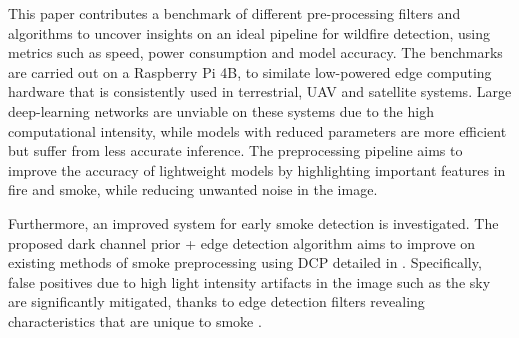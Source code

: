 \documentclass[lettersize,journal]{IEEEtran}
\begin{document}
This paper contributes a benchmark of different pre-processing filters
and algorithms to uncover insights on an ideal pipeline for wildfire
detection, using metrics such as speed, power consumption and model
accuracy. The benchmarks are carried out on a Raspberry Pi 4B, to
similate low-powered edge computing hardware that is consistently used
in terrestrial, UAV and satellite systems. Large deep-learning networks
are unviable on these systems due to the high computational intensity,
while models with reduced parameters are more efficient but suffer from
less accurate inference. The preprocessing pipeline aims to improve the
accuracy of lightweight models by highlighting important features in
fire and smoke, while reducing unwanted noise in the image.

Furthermore, an improved system for early smoke detection is
investigated. The proposed dark channel prior + edge detection algorithm
aims to improve on existing methods of smoke preprocessing using DCP
detailed in \cite{prepfire}. Specifically, false positives due to high
light intensity artifacts in the image such as the sky are significantly
mitigated, thanks to edge detection filters revealing characteristics
that are unique to smoke \cite{wsnfire}.




\newpage


\vfill
\end{document}
